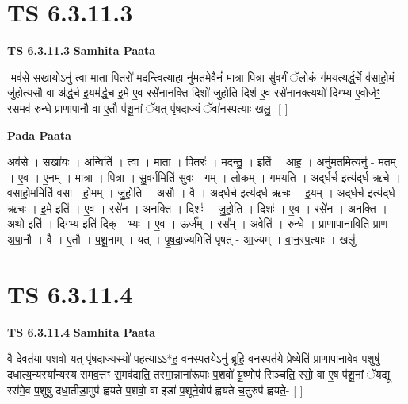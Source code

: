 \documentclass[17pt]{extarticle}
\begin{document}
\section*{ TS 6.3.11.3 }

\textbf{TS 6.3.11.3 } \newline
\textbf{Samhita Paata} \newline

-मव॑से॒ सखा॒योऽनु॑ त्वा मा॒ता पि॒तरो॑ मद॒न्त्वित्या॒हा-नु॑मतमे॒वैनं॑ मा॒त्रा पि॒त्रा सु॑व॒र्गं ॅलो॒कं ग॑मयत्यर्द्ध॒र्चे व॑साहो॒मं जु॑होत्य॒सौ वा अ॑र्द्ध॒र्च इ॒यम॑र्द्ध॒च इ॒मे ए॒व रसे॑नानक्ति॒ दिशो॑ जुहोति॒ दिश॑ ए॒व रसे॑नान॒क्त्यथो॑ दि॒ग्भ्य ए॒वोर्जꣳ॒॒ रस॒मव॑ रुन्धे प्राणापा॒नौ वा ए॒तौ प॑शू॒नां ॅयत् पृ॑षदा॒ज्यं ॅवा॑नस्प॒त्याः खलु॒- [  ] \newline

\textbf{Pada Paata} \newline

अव॑से । सखा॑यः । अन्विति॑ । त्वा॒ । मा॒ता । पि॒तरः॑ । म॒द॒न्तु॒ । इति॑ । आ॒ह॒ । अनु॑मत॒मित्यनु॑ - म॒त॒म् । ए॒व । ए॒न॒म् । मा॒त्रा । पि॒त्रा । सु॒व॒र्गमिति॑ सुवः - गम् । लो॒कम् । ग॒म॒य॒ति॒ । अ॒द्‌र्ध॒र्च इत्य॑द्‌र्ध-ऋ॒चे । व॒सा॒हो॒ममिति॑ वसा - हो॒मम् । जु॒हो॒ति॒ । अ॒सौ । वै । अ॒द्‌र्ध॒र्च इत्य॑द्‌र्ध-ऋ॒चः । इ॒यम् । अ॒द्‌र्ध॒र्च इत्य॑द्‌र्ध - ऋ॒चः । इ॒मे इति॑ । ए॒व । रसे॑न । अ॒न॒क्ति॒ । दिशः॑ । जु॒हो॒ति॒ । दिशः॑ । ए॒व । रसे॑न । अ॒न॒क्ति॒ । अथो॒ इति॑ । दि॒ग्भ्य इति॑ दिक् - भ्यः । ए॒व । ऊर्ज᳚म् । रस᳚म् । अवेति॑ । रु॒न्धे॒ । प्रा॒णा॒पा॒नाविति॑ प्राण - अ॒पा॒नौ । वै । ए॒तौ । प॒शू॒नाम् । यत् । पृ॒ष॒दा॒ज्यमिति॑ पृषत् - आ॒ज्यम् । वा॒न॒स्प॒त्याः । खलु॑ ।  \newline




\section*{ TS 6.3.11.4 }

\textbf{TS 6.3.11.4 } \newline
\textbf{Samhita Paata} \newline

वै दे॒वत॑या प॒शवो॒ यत् पृ॑षदा॒ज्यस्यो॑-प॒हत्याऽऽ*ह॒ वन॒स्पत॒येऽनु॑ ब्रूहि॒ वन॒स्पत॑ये॒ प्रेष्येति॑ प्राणापा॒नावे॒व प॒शुषु॑ दधात्य॒न्यस्या᳚न्यस्य समव॒त्तꣳ स॒मव॑द्यति॒ तस्मा॒न्नाना॑रूपाः प॒शवो॑ यू॒ष्णोप॑ सिञ्चति॒ रसो॒ वा ए॒ष प॑शू॒नां ॅयद्यू रस॑मे॒व प॒शुषु॑ दधा॒तीडा॒मुप॑ ह्वयते प॒शवो॒ वा इडा॑ प॒शूने॒वोप॑ ह्वयते च॒तुरुप॑ ह्वयते॒- [  ] \newline
\end{document}
